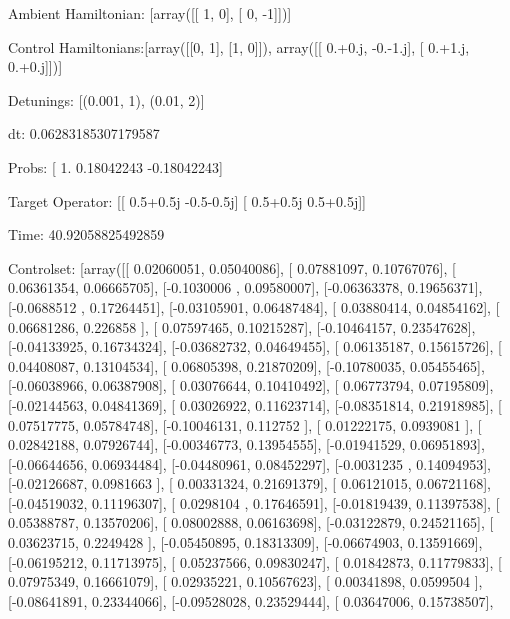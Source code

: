 \documentclass{article}
\begin{document}
    

\newpage

Ambient Hamiltonian: [array([[ 1,  0],
       [ 0, -1]])]

Control Hamiltonians:[array([[0, 1],
       [1, 0]]), array([[ 0.+0.j, -0.-1.j],
       [ 0.+1.j,  0.+0.j]])]

Detunings: [(0.001, 1), (0.01, 2)]

 dt: 0.06283185307179587

Probs: [ 1.          0.18042243 -0.18042243]

Target Operator: [[ 0.5+0.5j -0.5-0.5j]
 [ 0.5+0.5j  0.5+0.5j]]

Time: 40.92058825492859

Controlset: [array([[ 0.02060051,  0.05040086],
       [ 0.07881097,  0.10767076],
       [ 0.06361354,  0.06665705],
       [-0.1030006 ,  0.09580007],
       [-0.06363378,  0.19656371],
       [-0.0688512 ,  0.17264451],
       [-0.03105901,  0.06487484],
       [ 0.03880414,  0.04854162],
       [ 0.06681286,  0.226858  ],
       [ 0.07597465,  0.10215287],
       [-0.10464157,  0.23547628],
       [-0.04133925,  0.16734324],
       [-0.03682732,  0.04649455],
       [ 0.06135187,  0.15615726],
       [ 0.04408087,  0.13104534],
       [ 0.06805398,  0.21870209],
       [-0.10780035,  0.05455465],
       [-0.06038966,  0.06387908],
       [ 0.03076644,  0.10410492],
       [ 0.06773794,  0.07195809],
       [-0.02144563,  0.04841369],
       [ 0.03026922,  0.11623714],
       [-0.08351814,  0.21918985],
       [ 0.07517775,  0.05784748],
       [-0.10046131,  0.112752  ],
       [ 0.01222175,  0.0939081 ],
       [ 0.02842188,  0.07926744],
       [-0.00346773,  0.13954555],
       [-0.01941529,  0.06951893],
       [-0.06644656,  0.06934484],
       [-0.04480961,  0.08452297],
       [-0.0031235 ,  0.14094953],
       [-0.02126687,  0.0981663 ],
       [ 0.00331324,  0.21691379],
       [ 0.06121015,  0.06721168],
       [-0.04519032,  0.11196307],
       [ 0.0298104 ,  0.17646591],
       [-0.01819439,  0.11397538],
       [ 0.05388787,  0.13570206],
       [ 0.08002888,  0.06163698],
       [-0.03122879,  0.24521165],
       [ 0.03623715,  0.2249428 ],
       [-0.05450895,  0.18313309],
       [-0.06674903,  0.13591669],
       [-0.06195212,  0.11713975],
       [ 0.05237566,  0.09830247],
       [ 0.01842873,  0.11779833],
       [ 0.07975349,  0.16661079],
       [ 0.02935221,  0.10567623],
       [ 0.00341898,  0.0599504 ],
       [-0.08641891,  0.23344066],
       [-0.09528028,  0.23529444],
       [ 0.03647006,  0.15738507],
\end{document}
